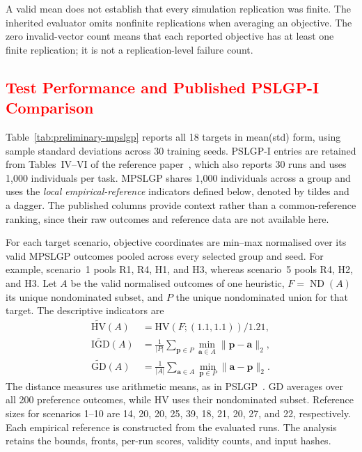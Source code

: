 \documentclass[10pt,journal]{IEEEtran}
\newcommand{\ablationrevision}[1]{\textcolor{red}{#1}}
\begin{document}
A valid mean does not establish that every simulation replication was finite. The inherited evaluator omits nonfinite replications when averaging an objective. The zero invalid-vector count means that each reported objective has at least one finite replication; it is not a replication-level failure count.

\subsection{\ablationrevision{Test Performance and Published PSLGP-I Comparison}}
Table~\ref{tab:preliminary-mpslgp} reports all 18 targets in mean(std) form, using sample standard deviations across 30 training seeds. PSLGP-I entries are retained from Tables~IV--VI of the reference paper~\cite{xu2026pslgp}, which also reports 30 runs and uses 1,000 individuals per task. MPSLGP shares 1,000 individuals across a group and uses the \emph{local empirical-reference} indicators defined below, denoted by tildes and a dagger. The published columns provide context rather than a common-reference ranking, since their raw outcomes and reference data are not available here.

For each target scenario, objective coordinates are min--max normalised over its valid MPSLGP outcomes pooled across every selected group and seed. For example, scenario~1 pools R1, R4, H1, and H3, whereas scenario~5 pools R4, H2, and H3. Let $A$ be the valid normalised outcomes of one heuristic, $F=\operatorname{ND}(A)$ its unique nondominated subset, and $P$ the unique nondominated union for that target. The descriptive indicators are
\begin{equation}
\begin{aligned}
\widetilde{\mathrm{HV}}(A)&=\mathrm{HV}(F;(1.1,1.1))/1.21,\\
\widetilde{\mathrm{IGD}}(A)&=\frac{1}{|P|}\sum_{\mathbf{p}\in P}\min_{\mathbf{a}\in A}\|\mathbf{p}-\mathbf{a}\|_2,\\
\widetilde{\mathrm{GD}}(A)&=\frac{1}{|A|}\sum_{\mathbf{a}\in A}\min_{\mathbf{p}\in P}\|\mathbf{a}-\mathbf{p}\|_2.
\end{aligned}
\label{eq:descriptive-test-metrics}
\end{equation}
The distance measures use arithmetic means, as in PSLGP~\cite{xu2026pslgp}. GD averages over all 200 preference outcomes, while HV uses their nondominated subset. Reference sizes for scenarios 1--10 are 14, 20, 20, 25, 39, 18, 21, 20, 27, and 22, respectively. Each empirical reference is constructed from the evaluated runs. The analysis retains the bounds, fronts, per-run scores, validity counts, and input hashes.
\end{document}
